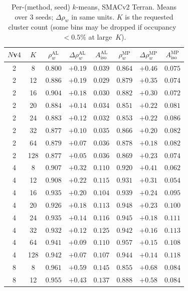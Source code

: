 \begin{table}[t]
\centering
\small
\caption{Per-(method, seed) $k$-means, SMACv2 Terran. Means over $3$ seeds; $\Delta\rho_w$ in same units. $K$ is the requested cluster count (some bins may be dropped if occupancy~$<0.5\%$ at large~$K$).}
\label{tab:rale-per-seed}
\begin{tabular}{cccccccc}
\toprule
$N$v$4$ & $K$ & $\rho_w^{\mathrm{AL}}$ & $\Delta\rho_w^{\mathrm{AL}}$ & $A_{\mathrm{iso}}^{\mathrm{AL}}$ & $\rho_w^{\mathrm{MP}}$ & $\Delta\rho_w^{\mathrm{MP}}$ & $A_{\mathrm{iso}}^{\mathrm{MP}}$ \\
\midrule
2 & 8 & $0.800$ & $+0.19$ & $0.039$ & $0.864$ & $+0.46$ & $0.075$ \\
2 & 12 & $0.886$ & $+0.19$ & $0.029$ & $0.879$ & $+0.35$ & $0.074$ \\
2 & 16 & $0.904$ & $+0.18$ & $0.030$ & $0.882$ & $+0.30$ & $0.072$ \\
2 & 20 & $0.884$ & $+0.14$ & $0.034$ & $0.851$ & $+0.22$ & $0.081$ \\
2 & 24 & $0.883$ & $+0.12$ & $0.032$ & $0.853$ & $+0.22$ & $0.086$ \\
2 & 32 & $0.877$ & $+0.10$ & $0.035$ & $0.866$ & $+0.20$ & $0.082$ \\
2 & 64 & $0.879$ & $+0.07$ & $0.036$ & $0.878$ & $+0.18$ & $0.082$ \\
2 & 128 & $0.877$ & $+0.05$ & $0.036$ & $0.869$ & $+0.23$ & $0.074$ \\
\midrule
4 & 8 & $0.907$ & $+0.32$ & $0.110$ & $0.920$ & $+0.41$ & $0.062$ \\
4 & 12 & $0.908$ & $+0.22$ & $0.115$ & $0.931$ & $+0.31$ & $0.054$ \\
4 & 16 & $0.935$ & $+0.20$ & $0.104$ & $0.939$ & $+0.24$ & $0.095$ \\
4 & 20 & $0.926$ & $+0.18$ & $0.113$ & $0.948$ & $+0.23$ & $0.100$ \\
4 & 24 & $0.935$ & $+0.14$ & $0.116$ & $0.945$ & $+0.18$ & $0.111$ \\
4 & 32 & $0.932$ & $+0.12$ & $0.125$ & $0.942$ & $+0.16$ & $0.113$ \\
4 & 64 & $0.941$ & $+0.09$ & $0.110$ & $0.957$ & $+0.15$ & $0.108$ \\
4 & 128 & $0.942$ & $+0.07$ & $0.107$ & $0.944$ & $+0.14$ & $0.118$ \\
\midrule
8 & 8 & $0.961$ & $+0.59$ & $0.145$ & $0.855$ & $+0.68$ & $0.084$ \\
8 & 12 & $0.955$ & $+0.43$ & $0.137$ & $0.888$ & $+0.58$ & $0.084$ \\

\end{tabular}
\end{table}

